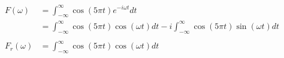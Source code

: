 \documentclass[preview]{standalone}
\begin{document}
\begin{align*}
F(\omega)&= \int_{-\infty}^{\infty} \cos{(5\pi t)}e^{-i\omega t} dt \\ &=\int_{-\infty}^{\infty} \cos{(5\pi t)}\cos{(\omega t)} dt - i\int_{-\infty}^{\infty} \cos{(5\pi t)}\sin{(\omega t)} dt \\ \\ F_{r}(\omega)&=\int_{-\infty}^{\infty} \cos{(5\pi t)}\cos{(\omega t)} dt
\end{align*}
\end{document}
